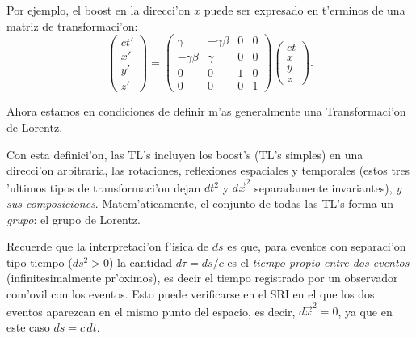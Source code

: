 \begin{center}
\end{center}
Por ejemplo, el boost en la direcci'on $x$ puede ser expresado en t'erminos de una matriz de transformaci'on:
\begin{equation}
 \left(\begin{array}{c} ct' \\ x' \\ y' \\z' \end{array}\right)=\left(
\begin{array}{cccc}
\gamma & -\gamma\beta & 0 &0 \\
-\gamma\beta & \gamma  & 0  & 0 \\
0 & 0 & 1  & 0 \\
0 & 0 & 0  & 1
\end{array}
\right)\left(\begin{array}{c} ct \\ x \\ y \\z \end{array}\right).
\end{equation}

Ahora estamos en condiciones de definir m'as generalmente una Transformaci'on de Lorentz. 

\begin{quotation}
\end{quotation}


Con esta definici'on, las TL's incluyen los boost's (TL's simples) en una direcci'on arbitraria, las rotaciones, reflexiones espaciales y temporales (estos tres 'ultimos tipos de transformaci'on dejan $dt^2$ y $d\vec{x}^2$ separadamente invariantes), \textit{y sus composiciones}. Matem'aticamente, el conjunto de todas las TL's forma un \textit{grupo}: el grupo de Lorentz.

Recuerde que la interpretaci'on f'isica de $ds$ es que, para eventos con separaci'on tipo tiempo ($ds^2>0$) la cantidad $d\tau=ds/c$ es el \textit{tiempo propio entre dos eventos} (infinitesimalmente pr'oximos), es decir el tiempo registrado por un observador com'ovil con los eventos. Esto puede verificarse en el SRI en el que los dos eventos aparezcan en el mismo punto del espacio, es decir, $d\vec{x}^2=0$, ya que en este caso $ds=c\,dt$.
